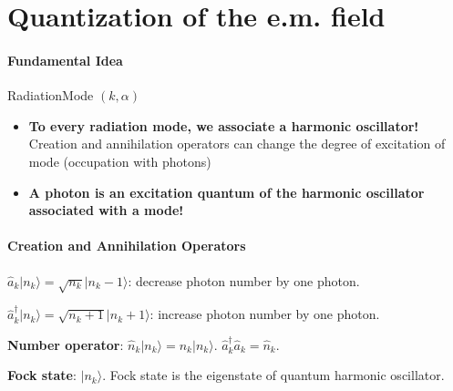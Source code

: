 \documentclass[../../note.tex]{subfiles}
\begin{document}
\section{Quantization of the e.m. field}
\paragraph{Fundamental Idea}
RadiationMode $(k, \alpha)$
\begin{itemize}
    \item \textbf{To every radiation mode, we associate a harmonic oscillator!} Creation and annihilation operators can change the degree of excitation of mode (occupation with photons) 
    \item \textbf{A photon is an excitation quantum of the harmonic oscillator associated with a mode!}
\end{itemize}

\paragraph{Creation and Annihilation Operators}
$\hat{a}_k \vert n_k \rangle = \sqrt{n_k} \vert n_k -1 \rangle$: decrease photon number by one photon.

$\hat{a}_k^\dagger \vert n_k \rangle = \sqrt{n_k + 1}  \vert n_k +1 \rangle$: increase photon number by one photon.

\textbf{Number operator}: $\hat{n}_k \vert n_k \rangle = n_k \vert n_k \rangle$. $\hat{a}^\dagger_k \hat{a}_k = \hat{n}_k$.

\textbf{Fock state}: $\vert n_k \rangle$. Fock state is the eigenstate of quantum harmonic oscillator.
\end{document}
